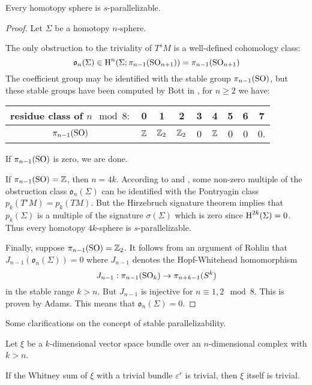 \begin{theorem}
	Every homotopy sphere is $s$-parallelizable.
\end{theorem}

\begin{proof}
	Let $\Sigma$ be a homotopy $n$-sphere.

	The only obstruction to the triviality of $T^sM$ is a well-defined cohomology class:
	\[
		\mathfrak{o}_n(\Sigma) \in \operatorname{H}^n(\Sigma; \pi_{n-1}(\operatorname{SO}_{n+1})) = \pi_{n-1}(\operatorname{SO}_{n+1})
	\]
	The coefficient group may be identified with the stable group $\pi_{n-1}(\operatorname{SO})$, but these stable groups have been computed by Bott in \cite{bott1957}, for $n\geq 2$ we have:
	\begin{center}
		\begin{tabular}{c|cccccccc}
			\textrm{residue class of $n\mod 8:$} & 0 & 1 & 2 & 3 & 4 & 5 & 6 & 7\\
			\hline
			$\pi_{n-1}(\operatorname{SO})$ & $\mathbb{Z}$ & $\mathbb{Z}_2$ & $\mathbb{Z}_2$ & 0 & $\mathbb{Z}$ & 0 & 0 & 0.
		\end{tabular}
	\end{center}
	If $\pi_{n-1}(\operatorname{SO})$ is zero, we are done. 

	If $\pi_{n-1}(\operatorname{SO}) = \mathbb{Z}$, then $n=4k$. According to \cite{kervairemilnor1960} and \cite{kervaire1959}, some non-zero multiple of the obstruction class $\mathfrak{o}_n(\Sigma)$ can be identified with the Pontryagin class $p_k(T^s M) = p_k(TM)$.  But the Hirzebruch signature theorem implies  that $p_k(\Sigma)$ is a multiple of the signature $\sigma(\Sigma)$ which is zero since $\operatorname{H}^{2k}(\Sigma)=0$. Thus every homotopy $4k$-sphere is $s$-parallelizable. 

	Finally, suppose $\pi_{n-1}(\operatorname{SO})= \mathbb{Z}_2$. It follows from an argument of Rohlin  that $J_{n-1}(\mathfrak{o}_n(\Sigma))=0$ where $J_{n-1}$ denotes the Hopf-Whitehead homomorphism
	\[
		J_{n-1} : \pi_{n-1}(\operatorname{SO}_k) \to \pi_{n+k-1}(S^k)
	\]
	in the stable range $k >n$. But $J_{n-1}$ is injective for $n\equiv 1, 2\mod 8$. This is proven by Adams.  This means that $\mathfrak{o}_n(\Sigma)=0$.
\end{proof}

Some clarifications on the concept of stable parallelizability.

Let $\xi$ be a $k$-dimensional vector space bundle over an $n$-dimensional complex with $k>n$.
\begin{lemma}
If the Whitney sum of $\xi$ with a trivial bundle $\varepsilon^r$ is trivial, then $\xi$ itself is trivial.
\end{lemma}

